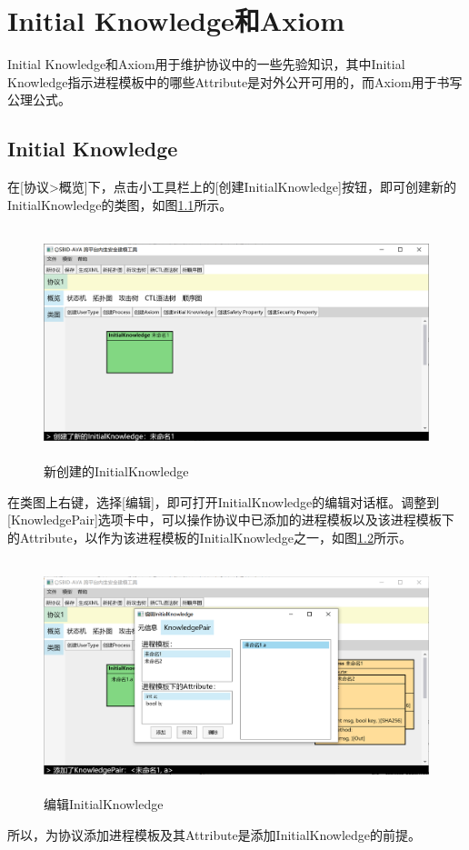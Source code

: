 \chapter{Initial Knowledge和Axiom}
Initial Knowledge和Axiom用于维护协议中的一些先验知识，其中Initial Knowledge指示进程模板中的哪些Attribute是对外公开可用的，而Axiom用于书写公理公式。

\section{Initial Knowledge}
在[协议>概览]下，点击小工具栏上的[创建InitialKnowledge]按钮，即可创建新的InitialKnowledge的类图，如图\ref{create_ik}所示。
\begin{figure}[h]
	\centering
	\includegraphics[width=12cm,height=6.75cm]{imgs/create_ik.png}
	\caption{新创建的InitialKnowledge}
	\label{create_ik}
\end{figure}
\par
在类图上右键，选择[编辑]，即可打开InitialKnowledge的编辑对话框。调整到[KnowledgePair]选项卡中，可以操作协议中已添加的进程模板以及该进程模板下的Attribute，以作为该进程模板的InitialKnowledge之一，如图\ref{edit_ik}所示。
\begin{figure}[h]
	\centering
	\includegraphics[width=12cm,height=6.75cm]{imgs/edit_ik.png}
	\caption{编辑InitialKnowledge}
	\label{edit_ik}
\end{figure}
\par
所以，为协议添加进程模板及其Attribute是添加InitialKnowledge的前提。

